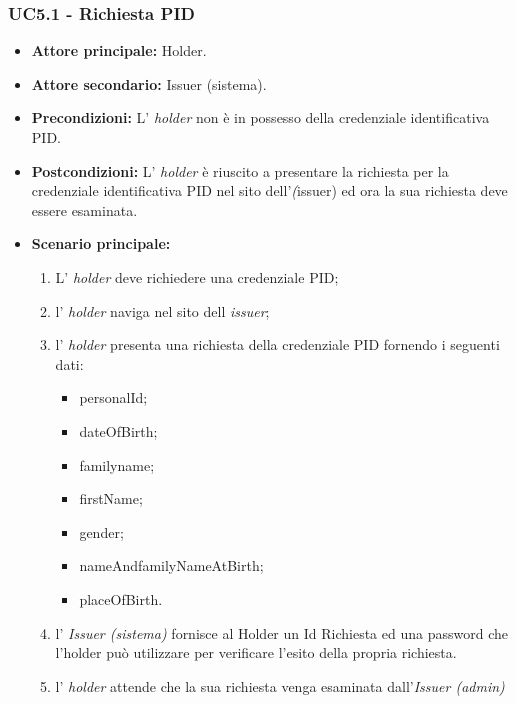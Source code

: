 \subsubsection{UC5.1 - Richiesta PID}
\begin{itemize}
\item \textbf{Attore principale:} Holder.
\item \textbf{Attore secondario:} Issuer (sistema). 
\item \textbf{Precondizioni:} L’ \textit{holder} non è in possesso della credenziale identificativa PID.
\item \textbf{Postcondizioni:} L’ \textit{holder} è riuscito a presentare la richiesta per la credenziale identificativa PID nel sito dell'\textit(issuer) ed ora la sua richiesta deve essere esaminata.
\item \textbf{Scenario principale:} 
    \begin{enumerate}
        \item L' \textit{holder} deve richiedere una credenziale PID; 
        \item l' \textit{holder} naviga nel sito dell \textit{issuer};
        \item l' \textit{holder} presenta una richiesta della credenziale PID fornendo i seguenti dati:
        \begin{itemize}
            \item personalId;
            \item dateOfBirth;
            \item familyname;
            \item firstName;
            \item gender;
            \item nameAndfamilyNameAtBirth;
            \item placeOfBirth.
        \end{itemize}
        \item l' \textit{Issuer (sistema)} fornisce al Holder un Id Richiesta ed una password che l'holder può utilizzare per verificare l'esito della propria richiesta.
        \item l' \textit{holder} attende che la sua richiesta venga esaminata dall'\textit{Issuer (admin)}
    \end{enumerate}
\end{itemize}

